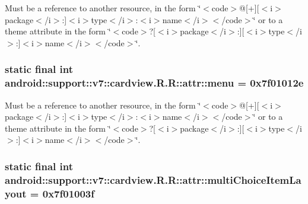 Must be a reference to another resource, in the form \char`\"{}$<$code$>$@\mbox{[}+\mbox{]}\mbox{[}$<$i$>$package$<$/i$>$:\mbox{]}$<$i$>$type$<$/i$>$:$<$i$>$name$<$/i$>$$<$/code$>$\char`\"{} or to a theme attribute in the form \char`\"{}$<$code$>$?\mbox{[}$<$i$>$package$<$/i$>$:\mbox{]}\mbox{[}$<$i$>$type$<$/i$>$:\mbox{]}$<$i$>$name$<$/i$>$$<$/code$>$\char`\"{}. \hypertarget{classandroid_1_1support_1_1v7_1_1cardview_1_1_r_1_1attr_9f451acd48edf1c9fdf9540c2d4e1c3e}{
\subsubsection[{menu}]{\setlength{\rightskip}{0pt plus 5cm}static final int android::support::v7::cardview.R.R::attr::menu = 0x7f01012e}}
\label{classandroid_1_1support_1_1v7_1_1cardview_1_1_r_1_1attr_9f451acd48edf1c9fdf9540c2d4e1c3e}


Must be a reference to another resource, in the form \char`\"{}$<$code$>$@\mbox{[}+\mbox{]}\mbox{[}$<$i$>$package$<$/i$>$:\mbox{]}$<$i$>$type$<$/i$>$:$<$i$>$name$<$/i$>$$<$/code$>$\char`\"{} or to a theme attribute in the form \char`\"{}$<$code$>$?\mbox{[}$<$i$>$package$<$/i$>$:\mbox{]}\mbox{[}$<$i$>$type$<$/i$>$:\mbox{]}$<$i$>$name$<$/i$>$$<$/code$>$\char`\"{}. \hypertarget{classandroid_1_1support_1_1v7_1_1cardview_1_1_r_1_1attr_18dba2c5eae8e6a4702a59d9fb5a855c}{
\subsubsection[{multiChoiceItemLayout}]{\setlength{\rightskip}{0pt plus 5cm}static final int android::support::v7::cardview.R.R::attr::multiChoiceItemLayout = 0x7f01003f}}
\label{classandroid_1_1support_1_1v7_1_1cardview_1_1_r_1_1attr_18dba2c5eae8e6a4702a59d9fb5a855c}


